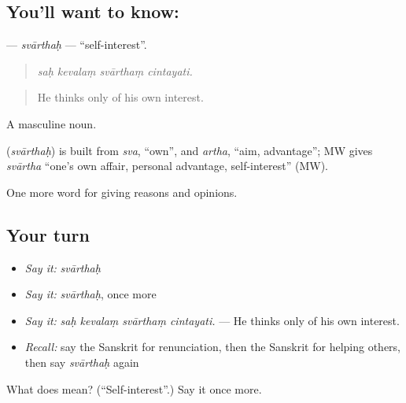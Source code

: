 \subsection*{You'll want to know: }
\textbf{} — \emph{svārthaḥ} — \textquotedblleft{}self-interest\textquotedblright{}.

\begin{quote}
   
\end{quote}

\begin{quote}
\emph{saḥ kevalaṃ svārthaṃ cintayati.}
\end{quote}

\begin{quote}
He thinks only of his own interest.
\end{quote}

A masculine noun.

\begin{cousinweb}
\textbf{} (\emph{svārthaḥ}) is built from \emph{sva}, \textquotedblleft{}own\textquotedblright{}, and \emph{artha}, \textquotedblleft{}aim, advantage\textquotedblright{}; MW gives \emph{svārtha} \textquotedblleft{}one's own affair, personal advantage, self-interest\textquotedblright{} (MW).
\end{cousinweb}

\begin{grammarlens}[title={What you've built}]
One more word for giving reasons and opinions.
\end{grammarlens}

\subsection*{Your turn}
\begin{itemize}
\raggedright
  \item \emph{Say it:} \emph{svārthaḥ}
  \item \emph{Say it:} \emph{svārthaḥ}, once more
  \item \emph{Say it:} \emph{saḥ kevalaṃ svārthaṃ cintayati.} — He thinks only of his own interest.
  \item \emph{Recall:} say the Sanskrit for renunciation, then the Sanskrit for helping others, then say \emph{svārthaḥ} again
\end{itemize}

\begin{tcolorbox}[breakable,colback=teal!4,colframe=teal!35!black,title={Before you move on}]
What does  mean? (\textquotedblleft{}Self-interest\textquotedblright{}.) Say it once more.
\end{tcolorbox}
